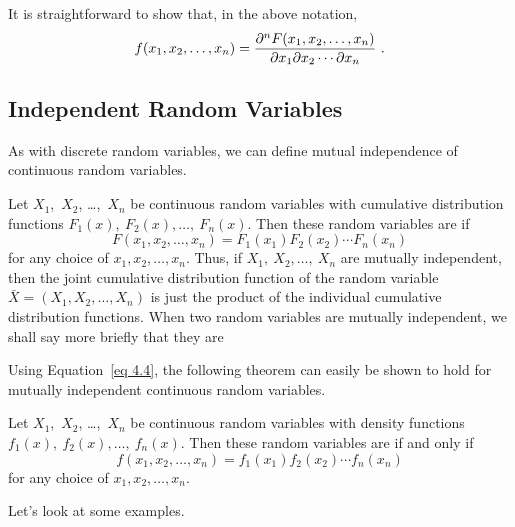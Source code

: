 It is straightforward to show that, in the above notation,
\begin{equation}
f(x_1, x_2, \ldots, x_n) = {{\partial^n F(x_1, x_2, \ldots, x_n)}\over
{\partial x_1 \partial x_2 \cdots \partial x_n}}\ .\label{eq 4.4}
\end{equation}

\subsection*{Independent Random Variables}

As with discrete random variables, we can define mutual independence of continuous
random variables.

\begin{definition}\label{def 4.6} Let $X_1$,~$X_2$, \ldots,~$X_n$ be continuous random
variables with cumulative distribution functions $F_1(x),~F_2(x), \ldots,~F_n(x)$.  Then
these random variables are  if
$$F(x_1, x_2, \ldots, x_n) = F_1(x_1)F_2(x_2) \cdots  F_n(x_n)$$   
for any choice of $x_1, x_2,
\ldots, x_n$.  Thus, if $X_1,~X_2, \ldots,~X_n$ are mutually independent, then the joint
cumulative distribution function of the random variable ${\bar X} = (X_1, X_2, \ldots,
X_n)$ is just the product of the individual cumulative distribution functions.  When two random
variables are mutually independent, we shall say more briefly that they are 
\end{definition}

Using Equation~\ref{eq 4.4}, the following theorem can easily be shown to hold for mutually
independent continuous random variables.

\begin{theorem}\label{thm 4.2}
Let $X_1$,~$X_2$, \ldots,~$X_n$ be continuous random variables with density
functions $f_1(x),~f_2(x), \ldots,~f_n(x)$.  Then these random variables are  if and only if
$$f(x_1, x_2, \ldots, x_n) = f_1(x_1)f_2(x_2) \cdots  f_n(x_n)$$    for any choice of $x_1,
x_2, \ldots, x_n$.  
\end{theorem}

Let's look at some examples.

